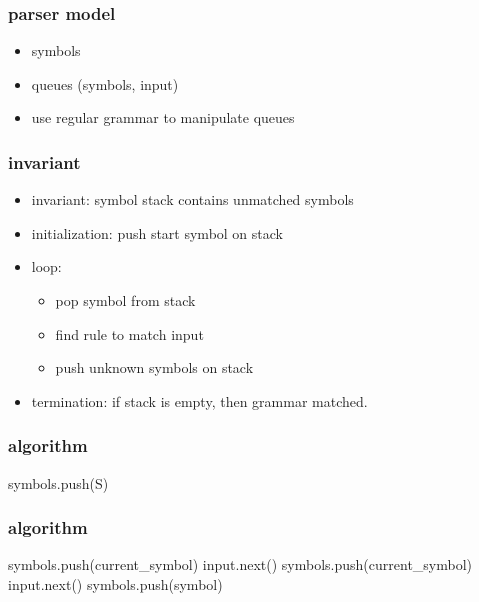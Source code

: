 \begin{frame}
    \frametitle{parser model}
    \begin{itemize}
        \item symbols
        \item queues (symbols, input)
        \item use regular grammar to manipulate queues
    \end{itemize}
\end{frame}

\begin{frame}
    \frametitle{invariant}
    \begin{itemize}
        \item invariant: symbol stack contains unmatched symbols
        \item initialization: push start symbol on stack
        \item loop:
        \begin{itemize}
            \item pop symbol from stack
            \item find rule to match input
            \item push unknown symbols on stack
        \end{itemize}
        \item termination: if stack is empty, then grammar matched.
    \end{itemize}
\end{frame}

\begin{frame}
    \frametitle{algorithm}
    \begin{algorithm}[H]
        symbols.push(S)\;
    \end{algorithm}
\end{frame}

\begin{frame}
    \frametitle{algorithm}
    \begin{algorithm}[H]
        \scriptsize
        {
            symbols.push(current\_symbol)\;
            \Return\;
        }
        {
            input.next()\;
            symbols.push(current\_symbol)\;
        }
        {
            {
                input.next()\;
            }
        }
        {
            {
                symbols.push(symbol)\;
            }
        }
    \end{algorithm}
\end{frame}
